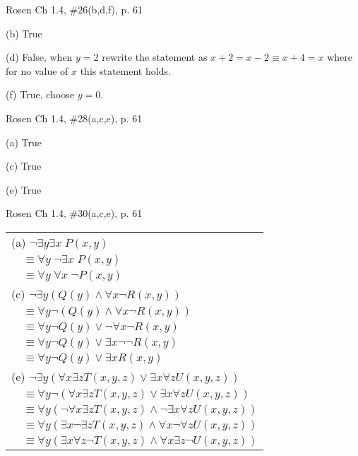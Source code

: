 \documentclass[12pt]{exam}
\newenvironment{my_item}{
\begin{itemize}
    \setlength{\itemsep}{1pt}
    \setlength{\parskip}{0pt}
    \setlength{\parsep}{0pt}
}{\end{itemize}}
\begin{document}
\begin{questions}
\question Rosen Ch 1.4, \#26(b,d,f), p. 61
    \begin{solution}
    \begin{my_item}
        \item[(b)] True
        \item[(d)] False, when $y=2$ rewrite the statement as $x + 2 = x - 2 \equiv x+4 = x$ where for no value of $x$ this statement holds.
        \item[(f)] True, choose $y=0$.
    \end{my_item}
    \end{solution}


\question Rosen Ch 1.4, \#28(a,c,e), p. 61
    \begin{solution}
    \begin{my_item}
        \item[(a)] True
        \item[(c)] True
        \item[(e)] True
    \end{my_item}
    \end{solution}


\question Rosen Ch 1.4, \#30(a,c,e), p. 61
    \begin{solution}

    \begin{tabular}{ll}
        \multicolumn{2}{l}{(a) $\neg \exists y \exists x\; P(x,y)$} \\
        \hspace{0.5in} & $\equiv \forall y\; \neg \exists x\; P(x,y)$ \\
          & $\equiv \forall y\; \forall x\; \neg P(x,y)$ \\
    \hline
        \multicolumn{2}{l}{(c) $\neg \exists y (Q(y) \wedge \forall x \neg R(x,y))$} \\
            & $\equiv \forall y \neg (Q(y) \wedge \forall x \neg R(x,y))$ \\
            & $\equiv \forall y \neg Q(y) \vee \neg \forall x \neg R(x,y)$ \\
            & $\equiv \forall y \neg Q(y) \vee \exists x \neg \neg R(x,y)$ \\
            & $\equiv \forall y \neg Q(y) \vee \exists x R(x,y)$ \\
    \hline
        \multicolumn{2}{l}{(e) $\neg \exists y (\forall x \exists z T(x,y,z) \vee \exists x \forall z U(x,y,z))$} \\
            & $\equiv \forall y \neg (\forall x \exists z T(x,y,z) \vee \exists x \forall z U(x,y,z))$ \\
            & $\equiv \forall y (\neg \forall x \exists z T(x,y,z) \wedge \neg \exists x \forall z U(x,y,z))$ \\
            & $\equiv \forall y (\exists x \neg \exists z T(x,y,z) \wedge \forall x \neg \forall z U(x,y,z))$ \\
            & $\equiv \forall y (\exists x \forall z \neg T(x,y,z) \wedge \forall x \exists z \neg U(x,y,z))$ \\
    \end{tabular}
    \end{solution}



\end{questions}
\end{document}

